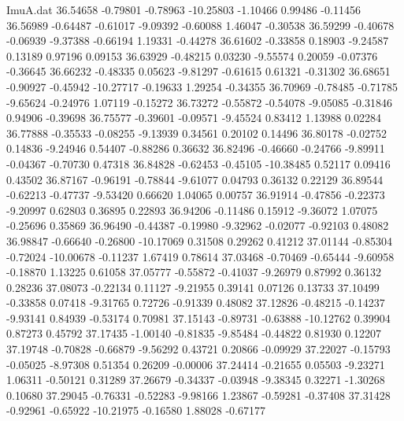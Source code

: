 \begin{filecontents}{ImuA.dat}
  36.54658   -0.79801   -0.78963  -10.25803   -1.10466    0.99486   -0.11456
  36.56989   -0.64487   -0.61017   -9.09392   -0.60088    1.46047   -0.30538
  36.59299   -0.40678   -0.06939   -9.37388   -0.66194    1.19331   -0.44278
  36.61602   -0.33858    0.18903   -9.24587    0.13189    0.97196    0.09153
  36.63929   -0.48215    0.03230   -9.55574    0.20059   -0.07376   -0.36645
  36.66232   -0.48335    0.05623   -9.81297   -0.61615    0.61321   -0.31302
  36.68651   -0.90927   -0.45942  -10.27717   -0.19633    1.29254   -0.34355
  36.70969   -0.78485   -0.71785   -9.65624   -0.24976    1.07119   -0.15272
  36.73272   -0.55872   -0.54078   -9.05085   -0.31846    0.94906   -0.39698
  36.75577   -0.39601   -0.09571   -9.45524    0.83412    1.13988    0.02284
  36.77888   -0.35533   -0.08255   -9.13939    0.34561    0.20102    0.14496
  36.80178   -0.02752    0.14836   -9.24946    0.54407   -0.88286    0.36632
  36.82496   -0.46660   -0.24766   -9.89911   -0.04367   -0.70730    0.47318
  36.84828   -0.62453   -0.45105  -10.38485    0.52117    0.09416    0.43502
  36.87167   -0.96191   -0.78844   -9.61077    0.04793    0.36132    0.22129
  36.89544   -0.62213   -0.47737   -9.53420    0.66620    1.04065    0.00757
  36.91914   -0.47856   -0.22373   -9.20997    0.62803    0.36895    0.22893
  36.94206   -0.11486    0.15912   -9.36072    1.07075   -0.25696    0.35869
  36.96490   -0.44387   -0.19980   -9.32962   -0.02077   -0.92103    0.48082
  36.98847   -0.66640   -0.26800  -10.17069    0.31508    0.29262    0.41212
  37.01144   -0.85304   -0.72024  -10.00678   -0.11237    1.67419    0.78614
  37.03468   -0.70469   -0.65444   -9.60958   -0.18870    1.13225    0.61058
  37.05777   -0.55872   -0.41037   -9.26979    0.87992    0.36132    0.28236
  37.08073   -0.22134    0.11127   -9.21955    0.39141    0.07126    0.13733
  37.10499   -0.33858    0.07418   -9.31765    0.72726   -0.91339    0.48082
  37.12826   -0.48215   -0.14237   -9.93141    0.84939   -0.53174    0.70981
  37.15143   -0.89731   -0.63888  -10.12762    0.39904    0.87273    0.45792
  37.17435   -1.00140   -0.81835   -9.85484   -0.44822    0.81930    0.12207
  37.19748   -0.70828   -0.66879   -9.56292    0.43721    0.20866   -0.09929
  37.22027   -0.15793   -0.05025   -8.97308    0.51354    0.26209   -0.00006
  37.24414   -0.21655    0.05503   -9.23271    1.06311   -0.50121    0.31289
  37.26679   -0.34337   -0.03948   -9.38345    0.32271   -1.30268    0.10680
  37.29045   -0.76331   -0.52283   -9.98166    1.23867   -0.59281   -0.37408
  37.31428   -0.92961   -0.65922  -10.21975   -0.16580    1.88028   -0.67177

\end{filecontents}
